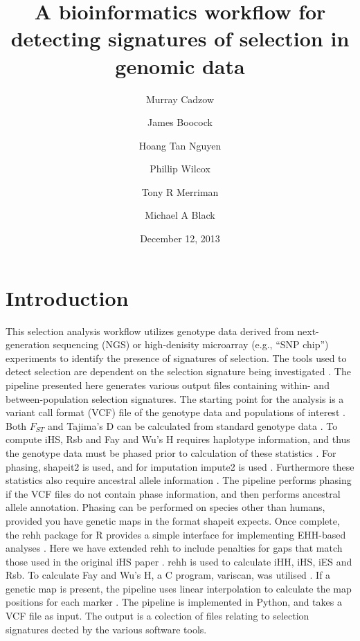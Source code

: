\documentclass[a4paper,10pt]{article}
\title{\textbf{A bioinformatics workflow for detecting signatures of selection in genomic data}}
\date{December 12, 2013}
\author[1]{Murray Cadzow}
\author[1]{James Boocock}
\author[1,2]{Hoang Tan Nguyen}
\author[1,3]{Phillip Wilcox}
\author[1]{Tony R Merriman}
\author[1]{Michael A Black}
\affil[1]{Department of Biochemistry, University of Otago}
\affil[2]{Department of Mathematics and Statistics, University of Otago}
\affil[3]{Scion Research, Rotorua, New Zealand}
\begin{document}
\maketitle{}\textmd{}
\tableofcontents

\pagebreak
\section{Introduction}

This selection analysis workflow utilizes genotype data derived from
next-generation sequencing (NGS) or high-denisity microarray (e.g.,
``SNP chip'') experiments to identify the presence of signatures of
selection. The tools used to detect selection are dependent on the
selection signature being investigated \citep{Sabeti:2006ha}. The
pipeline presented here generates various output files containing
within- and between-population selection signatures. The starting
point for the analysis
is a variant call format (VCF) file of the genotype data and
populations of interest \citep{Danecek:2011gz}. Both $F_{ST}$ and
Tajima's D can be calculated from standard genotype data
\citep{Weir:1984vn, Tajima:1989un}. To compute iHS, Rsb and Fay
and Wu's H requires haplotype information, and thus the genotype data must be
phased prior to calculation of these statistics \citep{Voight:2006go,
  Gautier:2012et,fayandwush}. For phasing, shapeit2 is
used, and for imputation impute2 is used \citep{impute22009,
  Delaneau:2013hi}. Furthermore these statistics also require
ancestral allele information \citep{Flicek:2012vg}.  The pipeline
performs phasing if the VCF files do not contain phase information, and
then performs ancestral allele annotation. Phasing can be performed on species other than humans, provided you have genetic maps in the format shapeit expects. 
Once complete, the rehh
package for R provides a simple interface for implementing EHH-based
analyses \citep{Gautier:2012et}. Here we have extended rehh to include penalties
for gaps that match those used in the original iHS paper
\citep{Voight:2006go}. rehh is used to calculate iHH, iHS, iES and Rsb. To
calculate Fay and Wu's H, a C program, variscan, was utilised
\citep{variscan2005}. If a genetic map is present, the pipeline uses linear interpolation to calculate the map positions for each
marker \citep{Nievergelt:2004ci}. The pipeline is implemented in Python, and takes a VCF
file as input. The output is a colection of files relating to selection
signatures dected by the various software tools.
\end{document}

